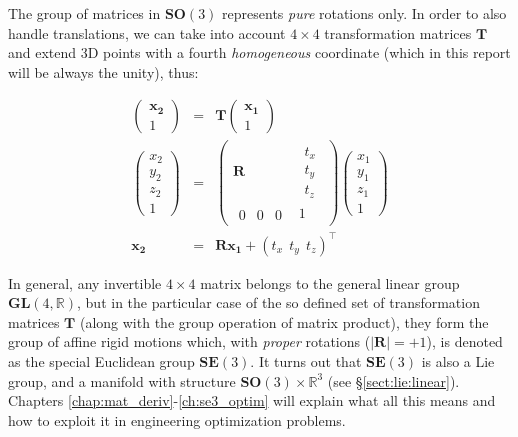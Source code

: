 \documentclass[a4paper,11pt]{report}
\begin{document}
The group of matrices in $\mathbf{SO}(3)$ represents \emph{pure} rotations only.
In order to also handle translations, we can take into account $4 \times 4$
transformation matrices $\mathbf{T}$ and extend 3D points with a fourth
\emph{homogeneous} coordinate (which in this report will be always the unity),
thus:

\begin{eqnarray}
\left(
\begin{array}{c}
 \mathbf{x_2} \\ 1
\end{array}
\right)
&=&
\mathbf{T}
\left(
\begin{array}{c}
 \mathbf{x_1} \\ 1
\end{array}
\right)
\nonumber \\
\label{eq:x2_T_x1}
\left(
\begin{array}{c}
 x_2 \\ y_2 \\ z_2 \\ 1
\end{array}
\right)
&=&
\left(
\begin{array}{c|c}
\mathbf{R} &
 \begin{array}{c}
   t_x \\ t_y \\ t_z
 \end{array} \\
\hline
 \begin{array}{ccc}
  0 & 0 & 0
 \end{array}
 &
 1
\end{array}
\right)
\left(
\begin{array}{c}
 x_1 \\ y_1 \\ z_1 \\ 1
\end{array}
\right)
\\
\mathbf{x_2} &=& \mathbf{R} \mathbf{x_1} +
\left(
t_x ~~ t_y ~~ t_z
\right)^\top \nonumber
\end{eqnarray}

In general, any invertible $4 \times 4$ matrix belongs to the
general linear group $\mathbf{GL}(4,\mathbb{R})$, but in the particular case of
the so defined set of transformation matrices $\mathbf{T}$
(along with the group operation of matrix product),
they form the group of affine rigid motions which, with \emph{proper} rotations
($|\mathbf{R}|=+1$), is denoted as the special Euclidean group $\mathbf{SE}(3)$.
It turns out that $\mathbf{SE}(3)$ is also a Lie group, and
a manifold with structure $\mathbf{SO}(3) \times \mathbb{R}^3$ (see \S\ref{sect:lie:linear}).
Chapters \ref{chap:mat_deriv}-\ref{ch:se3_optim} will explain
what all this means and how to exploit it in engineering optimization problems.
\end{document}
